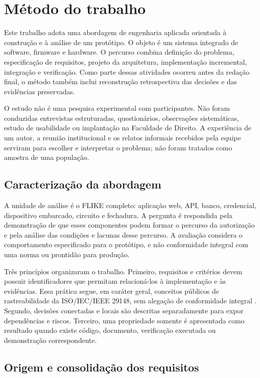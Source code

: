 \chapter{Método do trabalho} \label{cap:metodo}

Este trabalho adota uma abordagem de engenharia aplicada orientada à construção e à análise de um protótipo. O objeto é um sistema integrado de software, firmware e hardware. O percurso combina definição do problema, especificação de requisitos, projeto da arquitetura, implementação incremental, integração e verificação. Como parte dessas atividades ocorreu antes da redação final, o método também inclui reconstrução retrospectiva das decisões e das evidências preservadas.

O estudo não é uma pesquisa experimental com participantes. Não foram conduzidas entrevistas estruturadas, questionários, observações sistemáticas, estudo de usabilidade ou implantação na Faculdade de Direito. A experiência de um autor, a reunião institucional e os relatos informais recebidos pela equipe serviram para escolher e interpretar o problema; não foram tratados como amostra de uma população.

\section{Caracterização da abordagem}

A unidade de análise é o FLIKE completo: aplicação web, API, banco, credencial, dispositivo embarcado, circuito e fechadura. A pergunta é respondida pela demonstração de que esses componentes podem formar o percurso da autorização e pela análise das condições e lacunas desse percurso. A avaliação considera o comportamento especificado para o protótipo, e não conformidade integral com uma norma ou prontidão para produção.

Três princípios organizaram o trabalho. Primeiro, requisitos e critérios devem possuir identificadores que permitam relacioná-los à implementação e às evidências. Essa prática segue, em caráter geral, conceitos públicos de rastreabilidade da ISO/IEC/IEEE 29148, sem alegação de conformidade integral \cite{iso29148:2018}. Segundo, decisões conectadas e locais são descritas separadamente para expor dependências e riscos. Terceiro, uma propriedade somente é apresentada como resultado quando existe código, documento, verificação executada ou demonstração correspondente.

\section{Origem e consolidação dos requisitos}

